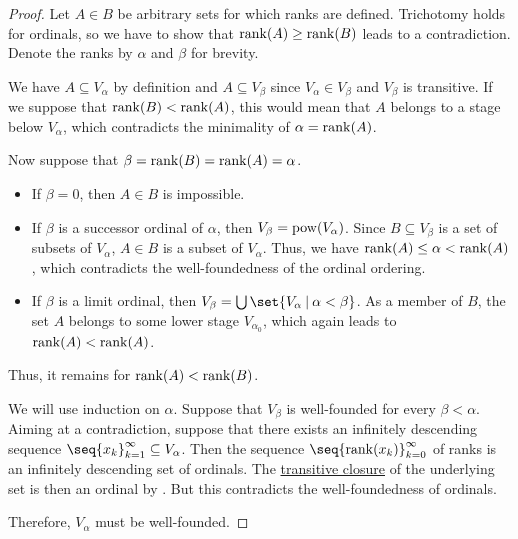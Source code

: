 \begin{proof}
   Let \( A \in B \) be arbitrary sets for which ranks are defined. Trichotomy holds for ordinals, so we have to show that \( \operatorname{rank}(A) \geq \operatorname{rank}(B) \) leads to a contradiction. Denote the ranks by \( \alpha \) and \( \beta \) for brevity.

  We have \( A \subseteq V_\alpha \) by definition and \( A \subseteq V_\beta \) since \( V_\alpha \in V_\beta \) and \( V_\beta \) is transitive. If we suppose that \( \operatorname{rank}(B) < \operatorname{rank}(A) \), this would mean that \( A \) belongs to a stage below \( V_\alpha \), which contradicts the minimality of \( \alpha = \operatorname{rank}(A) \).

  Now suppose that \( \beta = \operatorname{rank}(B) = \operatorname{rank}(A) = \alpha \).
  \begin{itemize}
    \item If \( \beta = 0 \), then \( A \in B \) is impossible.

    \item If \( \beta \) is a successor ordinal of \( \alpha \), then \( V_\beta = \operatorname{pow}(V_\alpha) \). Since \( B \subseteq V_\beta \) is a set of subsets of \( V_\alpha \), \( A \in B \) is a subset of \( V_\alpha \). Thus, we have \( \operatorname{rank}(A) \leq \alpha < \operatorname{rank}(A) \), which contradicts the well-foundedness of the ordinal ordering.

    \item If \( \beta \) is a limit ordinal, then \( V_\beta = \bigcup\set{ V_\alpha \given \alpha < \beta } \). As a member of \( B \), the set \( A \) belongs to some lower stage \( V_{\alpha_0} \), which again leads to \( \operatorname{rank}(A) < \operatorname{rank}(A) \).
  \end{itemize}

  Thus, it remains for \( \operatorname{rank}(A) < \operatorname{rank}(B) \).

   We will use induction on \( \alpha \). Suppose that \( V_\beta \) is well-founded for every \( \beta < \alpha \). Aiming at a contradiction, suppose that there exists an infinitely descending sequence \( \seq{ x_k }_{k=1}^\infty \subseteq V_\alpha \). Then the sequence \( \seq{ \rank(x_k) }_{k=0}^\infty \) of ranks is an infinitely descending set of ordinals. The \hyperref[def:transitive_closure_of_a_set]{transitive closure} of the underlying set is then an ordinal by . But this contradicts the well-foundedness of ordinals.

  Therefore, \( V_\alpha \) must be well-founded.


\end{proof}

